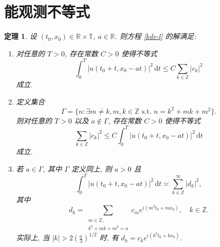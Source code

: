 \documentclass[master]{cugthesis}
\newcommand\R{\ensuremath{\mathbb{R}}}
\newcommand\Z{\ensuremath{\mathbb{Z}}}
\newcommand\T{\ensuremath{\mathbb{T}}}
\renewcommand\d{\ensuremath{\,\mathrm{d}}}
\newtheorem{theorem}{定理}[chapter]
\begin{document}
    \section{能观测不等式}
    
    \begin{theorem}\label{thm3-2-1}
    设 $(t_0,x_0)\in \R\times \T$, $a\in \R$. 则方程 \eqref{kdv-l} 的解满足:
    \begin{enumerate}
        \item[\rm{(1)}] 对任意的 $T>0$, 存在常数 $C>0$ 使得不等式
        \begin{equation}\label{3-2-1}
            \int_0^T\left| u(t_0+t,x_0-at) \right|^2\d t \le C  \sum_{k\in \Z} |c_k|^2
        \end{equation}
        成立.
        \item[\rm{(2)}] 定义集合
        \begin{equation*}
            \Gamma=\lbrace n:\exists m\neq k, m,k\in \Z \text{ s.t. }n=k^2+mk+m^2 \rbrace.
        \end{equation*}
        则对任意的 $T>0$ 以及 $a\notin \Gamma$, 存在常数 $C>0$ 使得不等式
        \begin{equation}\label{3-2-2}
            \sum_{k\in\Z} |c_k|^2 \le C \int_0^T |u(t_0+t,x_0-at)|^2 \d t
        \end{equation}
        成立.
        \item[\rm{(3)}] 若 $a\in \Gamma$, 其中 $\Gamma$ 定义同上, 则 $a>0$ 且
        \begin{equation}\label{3-2-3}
            \int_0^T |u(t_0+t,x_0-at)|^2\d t\asymp \sum_{k\in\Z}^\infty|d_k|^2,
        \end{equation}
        其中
        \begin{equation*}
            d_k=\sum_{\substack{
                m\in \Z,  \\
                k^2+mk+m^2 = a }} 
             c_me^{i(m^3t_0+mx_0)},\quad k\in \Z.
        \end{equation*}
        实际上, 当 $|k|> 2\left(\frac{a}{3}\right)^{1 /2}$ 时, 有 $d_k=c_k e^{i (k^3t_0+kx_0)}$.
    \end{enumerate}
    \end{theorem}
    
\end{document}
